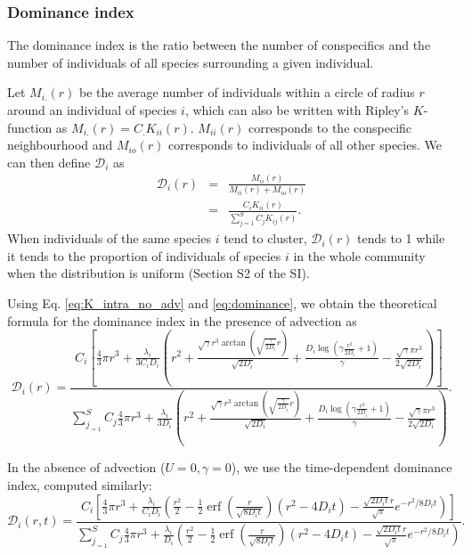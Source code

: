 \documentclass[english]{article}
\DeclareMathOperator\erf{erf}
\begin{document}
\subsubsection*{Dominance index}

The dominance index \citep[defined in Table S1 in the Supporting Information of][]{wiegand_how_2007}
is the ratio between the number of conspecifics and the number of
individuals of all species surrounding a given individual.

 Let $M_{i.}(r)$ be the average number of individuals within a circle
of radius $r$ around an individual of species $i$, which can also
be written with Ripley's $K$-function as $M_{i.}(r)=C_{.}K_{ii}(r)$.
$M_{ii}(r)$ corresponds to the conspecific neighbourhood and $M_{io}(r)$
corresponds to individuals of all other species. We can then define
$\mathcal{D}_{i}$ as
\begin{equation}
\begin{array}{ccc}
\mathcal{D}_{i}(r) & = & \frac{M_{ii}(r)}{M_{ii}(r)+M_{io}(r)}\\
 & = & \frac{C_{i}K_{ii}(r)}{\sum_{j=1}^{S}C_{j}K_{ij}(r)}.
\end{array}\label{eq:dominance}
\end{equation}
When individuals of the same species $i$ tend to cluster, $\mathcal{D}_{i}(r)$
tends to 1 while it tends to the proportion of individuals of species
$i$ in the whole community when the distribution is uniform (Section
S2 of the SI).

Using Eq. \ref{eq:K_intra_no_adv} and \ref{eq:dominance}, we obtain
the theoretical formula for the dominance index in the presence of
advection as
\begin{equation}
\mathcal{D}_{i}(r)=\frac{C_{i}\left[\frac{4}{3}\pi r^{3}+\frac{\lambda_i}{3C_{i}D_i}\left(r^{2}+\frac{\sqrt{\gamma}r^{3}\arctan(\sqrt{\frac{\gamma}{2D_i}}r)}{\sqrt{2D_i}}+\frac{D_i\log\left(\gamma\frac{r^{2}}{2D_i}+1\right)}{\gamma}-\frac{\sqrt{\gamma}\pi r^{3}}{2\sqrt{2D_i}}\right)\right]}{\sum_{j_{=1}}^{S}C_{j}\frac{4}{3}\pi r^{3}+\frac{\lambda_i}{3D_i}\left(r^{2}+\frac{\sqrt{\gamma}r^{3}\arctan(\sqrt{\frac{\gamma}{2D_i}}r)}{\sqrt{2D_i}}+\frac{D_i\log\left(\gamma\frac{r^{2}}{2D_i}+1\right)}{\gamma}-\frac{\sqrt{\gamma}\pi r^{3}}{2\sqrt{2D_i}}\right)}.\label{eq:dom_adv}
\end{equation}

In the absence of advection ($U=0,\gamma=0$), we use the time-dependent
dominance index, computed similarly:
\begin{equation}
\mathcal{D}_{i}(r,t)=\frac{C_{i}\left[\frac{4}{3}\pi r^{3}+\frac{\lambda_i}{C_{i}D_i}\left(\frac{r^{2}}{2}-\frac{1}{2}\erf(\frac{r}{\sqrt{8D_i t}})(r^{2}-4D_i t)-\frac{\sqrt{2D_it}r}{\sqrt{\pi}}e^{-r^{2}/8D_i t}\right)\right]}{\sum_{j_{=1}}^{S}C_{j}\frac{4}{3}\pi r^{3}+\frac{\lambda_i}{D_i}\left(\frac{r^{2}}{2}-\frac{1}{2}\erf(\frac{r}{\sqrt{8D_i t}})(r^{2}-4D_i t)-\frac{\sqrt{2D_i t}r}{\sqrt{\pi}}e^{-r^{2}/8D_i t}\right)}.\label{eq:dom_noadv}
\end{equation}
\end{document}
